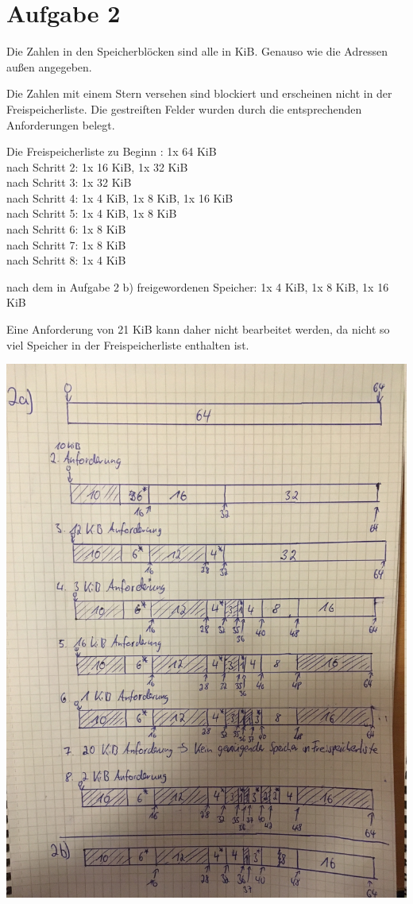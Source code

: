 \documentclass{ti2}
\begin{document}
\section*{Aufgabe 2}

Die Zahlen in den Speicherblöcken sind alle in KiB. Genauso wie die Adressen außen angegeben.

Die Zahlen mit einem Stern versehen sind blockiert und erscheinen nicht in der Freispeicherliste. Die gestreiften Felder wurden durch die entsprechenden Anforderungen belegt.

Die Freispeicherliste zu Beginn : 1x  64 KiB \\
nach Schritt 2: 1x 16 KiB, 1x 32 KiB \\
nach Schritt 3: 1x 32 KiB \\
nach Schritt 4: 1x 4 KiB, 1x 8 KiB, 1x 16 KiB\\
nach Schritt 5: 1x 4 KiB, 1x 8 KiB\\
nach Schritt 6: 1x 8 KiB\\
nach Schritt 7: 1x 8 KiB\\
nach Schritt 8: 1x 4 KiB

nach dem in Aufgabe 2 b) freigewordenen Speicher: 1x 4 KiB, 1x 8 KiB, 1x 16 KiB

Eine Anforderung von 21 KiB kann daher nicht bearbeitet werden, da nicht so viel Speicher in der Freispeicherliste enthalten ist.

\includegraphics[width=16cm]{aufg2.JPG}
\end{document}
